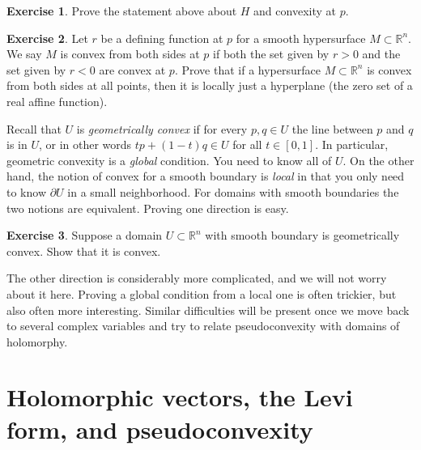 \documentclass[12pt,openany]{book}
\newcommand{\R}{{\mathbb{R}}}
\newcommand{\myindex}[1]{#1\index{#1}}
\theoremstyle{plain}
\theoremstyle{remark}
\theoremstyle{definition}
\newenvironment{exbox}{%
    \def\FrameCommand{\vrule width 1pt \relax\hspace{10pt}}%
    \MakeFramed {\advance \hsize -\width \FrameRestore}%
}{%
    \endMakeFramed
}
\theoremstyle{exercise}
\newtheorem{exercise}{Exercise}[section]
\theoremstyle{example}
\begin{document}
\begin{exbox}
\begin{exercise}
Prove the statement above about $H$ and convexity at $p$.
\end{exercise}

\begin{exercise}
Let $r$ be a defining function at $p$ for a smooth hypersurface
$M \subset \R^n$.
We say $M$ is convex from both sides at $p$ if both the set given by
$r > 0$ and the set given by $r < 0$ are convex at $p$.
Prove that if a hypersurface $M \subset \R^n$ is convex from both sides at all
points, then it is locally just a hyperplane (the zero set of a real affine
function).
\end{exercise}
\end{exbox}

Recall that $U$ is \emph{\myindex{geometrically convex}} if for every $p,q \in U$ the
line between $p$ and $q$ is in $U$, or in other words
$tp +(1-t)q \in U$ for all $t \in [0,1]$.
In particular, geometric convexity is a \emph{global} condition.  You need 
to know all of $U$.  On the other hand, the notion of convex for a smooth boundary is
\emph{local} in that you only need to know $\partial U$ in a small
neighborhood.  For domains with
smooth boundaries the two notions are equivalent.  Proving
one direction is easy.

\begin{exbox}
\begin{exercise}
Suppose a domain $U \subset \R^n$ with smooth
boundary is geometrically
convex.  Show that it is convex.
\end{exercise}
\end{exbox}

The other direction is considerably more complicated, and we will not worry
about it here.  Proving a global condition from a local one is often
trickier, but also often more interesting.
Similar difficulties will be present once we move back to
several complex variables and try to relate pseudoconvexity with domains of
holomorphy.


\section{Holomorphic vectors, the Levi form, and pseudoconvexity}
\end{document}
